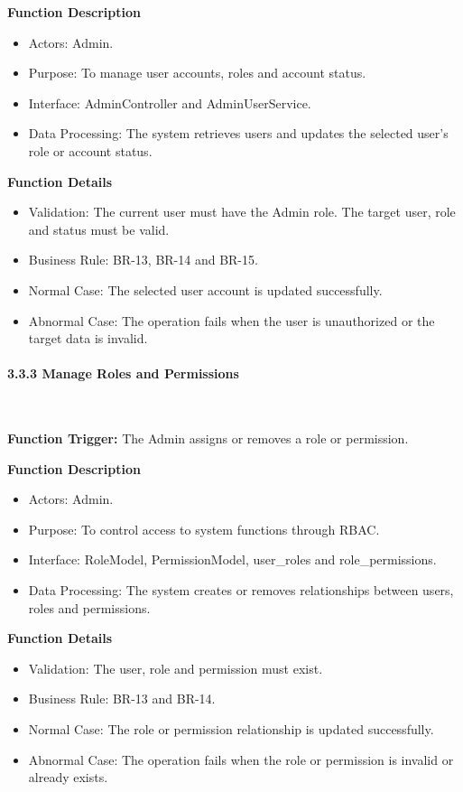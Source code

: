 \textbf{Function Description}
\begin{itemize}[leftmargin=1.5em, nosep]
    \item Actors: Admin.
    \item Purpose: To manage user accounts, roles and account status.
    \item Interface: AdminController and AdminUserService.
    \item Data Processing: The system retrieves users and updates the selected user's role or account status.
\end{itemize}

\textbf{Function Details}
\begin{itemize}[leftmargin=1.5em, nosep]
    \item Validation: The current user must have the Admin role. The target user, role and status must be valid.
    \item Business Rule: BR-13, BR-14 and BR-15.
    \item Normal Case: The selected user account is updated successfully.
    \item Abnormal Case: The operation fails when the user is unauthorized or the target data is invalid.
\end{itemize}

\paragraph*{3.3.3 Manage Roles and Permissions}\leavevmode\\[-0.5em]
\label{par:manage-roles-permissions}

\textbf{Function Trigger:} The Admin assigns or removes a role or permission.

\textbf{Function Description}
\begin{itemize}[leftmargin=1.5em, nosep]
    \item Actors: Admin.
    \item Purpose: To control access to system functions through RBAC.
    \item Interface: RoleModel, PermissionModel, user\_roles and role\_permissions.
    \item Data Processing: The system creates or removes relationships between users, roles and permissions.
\end{itemize}

\textbf{Function Details}
\begin{itemize}[leftmargin=1.5em, nosep]
    \item Validation: The user, role and permission must exist.
    \item Business Rule: BR-13 and BR-14.
    \item Normal Case: The role or permission relationship is updated successfully.
    \item Abnormal Case: The operation fails when the role or permission is invalid or already exists.
\end{itemize}


